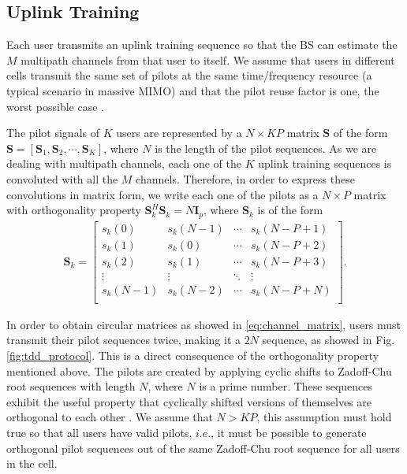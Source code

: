 \documentclass[10pt,journal,comsoc,final]{IEEEtran}
\begin{document}
\subsection{Uplink Training}
Each user transmits an uplink training sequence so that the BS can estimate the $M$ multipath channels from that user to itself. We assume that users in different cells transmit the same set of pilots at the same time/frequency resource (a typical scenario in massive MIMO) and that the pilot reuse factor is one, the worst possible case \cite{marzetta:noncooperative}.

The pilot signals of $K$ users are represented by a $N \times KP$ matrix $\textbf{S}$ of the form $\textbf{S} = \left[ \textbf{S}_{1},  \textbf{S}_{2},  \cdots, \textbf{S}_{K}\right]$, where $N$ is the length of the pilot sequences. As we are dealing with multipath channels, each one of the $K$ uplink training sequences is convoluted with all the $M$ channels. Therefore, in order to express these convolutions in matrix form, we write each one of the pilots as a $N \times P$ matrix with orthogonality property $\textbf{S}_{k}^{H} \textbf{S}_{k} = N\textbf{I}_{p}$, where $ \textbf{S}_{k}$ is of the form
\begin{equation}\label{eq:pilot_matrix}
\begin{split}
\textbf{S}_{k} = \left[\begin{array}{cccc}
{s}_{k}(0) & {s}_{k}(N-1) & \cdots & {s}_{k}(N-P+1) \\
{s}_{k}(1) & {s}_{k}(0) & \cdots & {s}_{k}(N-P+2) \\
{s}_{k}(2) & {s}_{k}(1) & \cdots & {s}_{k}(N-P+3) \\
\vdots & \vdots & \ddots & \vdots \\
{s}_{k}(N-1) & {s}_{k}(N-2) & \cdots & {s}_{k}(N-P+N) \\ \end{array} \right].
\end{split}
\end{equation}

In order to obtain circular matrices as showed in \eqref{eq:channel_matrix}, users must transmit their pilot sequences twice, making it a $2N$ sequence, as showed in Fig. \ref{fig:tdd_protocol}. This is a direct consequence of the orthogonality property mentioned above. The pilots are created by applying cyclic shifts to Zadoff-Chu root sequences with length $N$, where $N$ is a prime number. These sequences exhibit the useful property that cyclically shifted versions of themselves are orthogonal to each other \cite{zadoffchu:zadoffchu}.
We assume that $N > KP$, this assumption must hold true so that all users have valid pilots, $i.e.$, it must be possible to generate orthogonal pilot sequences out of the same Zadoff-Chu root sequence for all users in the cell.
\end{document}
